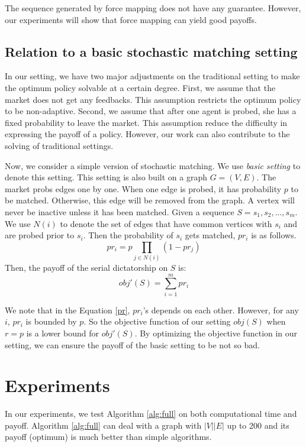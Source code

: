 \documentclass[letterpaper]{article}
\begin{document}
The sequence generated by force mapping does not have any guarantee.
However, our experiments will show that force mapping can yield good payoffs.

\subsection{Relation to a basic stochastic matching setting}\label{sec:basic}

In our setting, we have two major adjustments on the traditional setting to make the optimum policy solvable at a certain degree.
First, we assume that the market does not get any feedbacks.
This assumption restricts the optimum policy to be non-adaptive.
Second, we assume that after one agent is probed, she has a fixed probability to leave the market.
This assumption reduce the difficulty in expressing the payoff of a policy.
However, our work can also contribute to the solving of traditional settings.

Now, we consider a simple version of stochastic matching.
We use \textit{basic setting} to denote this setting.
This setting is also built on a graph $G=(V,E)$.
The market probs edges one by one.
When one edge is probed, it has probability $p$ to be matched.
Otherwise, this edge will be removed from the graph.
A vertex will never be inactive unless it has been matched.
Given a sequence $S=s_1,s_2,\ldots,s_m$.
We use $N(i)$ to denote the set of edges that have common vertices with $s_i$ and are probed prior to $s_i$.
Then the probability of $s_i$ gets matched, $pr_i$ is as follows.
\begin{equation}
pr_i=p\prod_{j\in N(i)}(1-pr_j)\label{pr}
\end{equation}
Then, the payoff of the serial dictatorship on $S$ is:
\begin{equation}
obj'(S)=\sum_{i=1}^m pr_i
\end{equation}

We note that in the Equation \ref{pr}, $pr_i$'s depends on each other.
However, for any $i$, $pr_i$ is bounded by $p$.
So the objective function of our setting $obj(S)$ when $r=p$ is a lower bound for $obj'(S)$.
By optimizing the objective function in our setting, we can ensure the payoff of the basic setting to be not so bad.

\section{Experiments}

In our experiments, we test Algorithm \ref{alg:full} on both computational time and payoff.
Algorithm \ref{alg:full} can deal with a graph with $|V||E|$ up to 200 and its payoff (optimum) is much better than simple algorithms.
\end{document}
